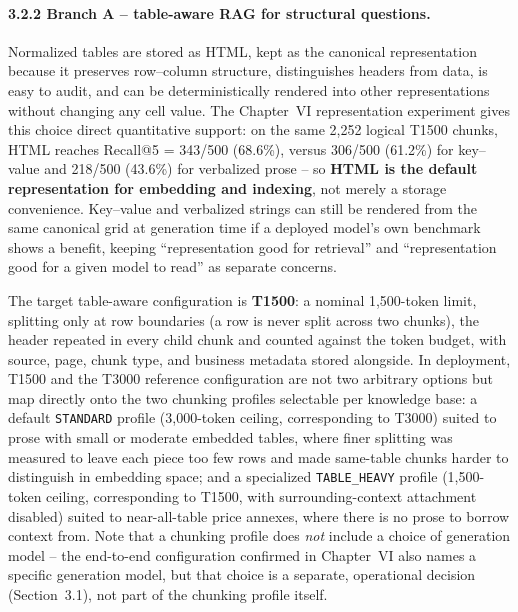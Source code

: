 \documentclass[11pt,a4paper]{article}
\begin{document}
\paragraph{3.2.2 Branch A -- table-aware RAG for structural questions.}
Normalized tables are stored as HTML, kept as the canonical representation
because it preserves row--column structure, distinguishes headers from data,
is easy to audit, and can be deterministically rendered into other
representations without changing any cell value. The Chapter~VI
representation experiment gives this choice direct quantitative support: on
the same 2,252 logical T1500 chunks, HTML reaches Recall@5 = 343/500
(68.6\%), versus 306/500 (61.2\%) for key--value and 218/500 (43.6\%) for
verbalized prose -- so \textbf{HTML is the default representation for
embedding and indexing}, not merely a storage convenience. Key--value and
verbalized strings can still be rendered from the same canonical grid at
generation time if a deployed model's own benchmark shows a benefit, keeping
``representation good for retrieval'' and ``representation good for a given
model to read'' as separate concerns.

The target table-aware configuration is \textbf{T1500}: a nominal 1,500-token
limit, splitting only at row boundaries (a row is never split across two
chunks), the header repeated in every child chunk and counted against the
token budget, with source, page, chunk type, and business metadata stored
alongside. In deployment, T1500 and the T3000 reference configuration are
not two arbitrary options but map directly onto the two chunking profiles
selectable per knowledge base: a default \texttt{STANDARD} profile (3,000-token
ceiling, corresponding to T3000) suited to prose with small or moderate
embedded tables, where finer splitting was measured to leave each piece too
few rows and made same-table chunks harder to distinguish in embedding
space; and a specialized \texttt{TABLE\_HEAVY} profile (1,500-token ceiling,
corresponding to T1500, with surrounding-context attachment disabled) suited
to near-all-table price annexes, where there is no prose to borrow context
from. Note that a chunking profile does \emph{not} include a choice of
generation model -- the end-to-end configuration confirmed in Chapter~VI
also names a specific generation model, but that choice is a separate,
operational decision (Section~3.1), not part of the chunking profile itself.
\end{document}
